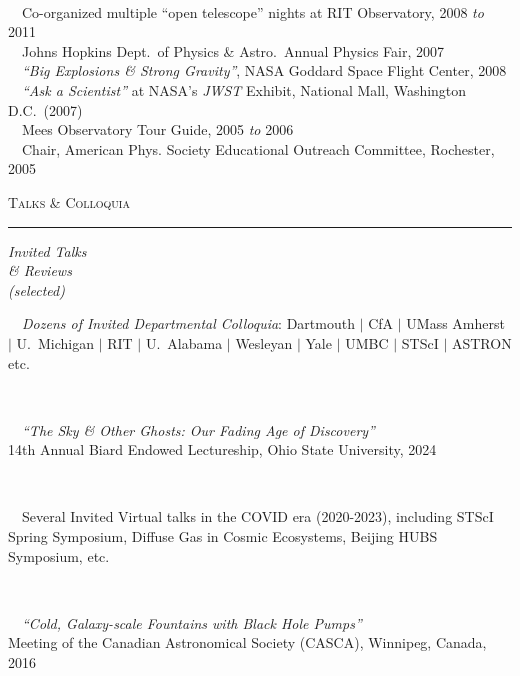 \documentclass[11pt]{article}
\makeatletter
\def\vhrulefill#1{\leavevmode\leaders\hrule\@height#1\hfill \kern\z@}
\makeatother
\begin{document}
{\\ \textbullet~~Co-organized multiple ``open telescope'' nights at RIT Observatory, 2008 \textit{to} 2011
\\ \textbullet~~Johns Hopkins Dept.~of Physics \& Astro.~Annual Physics Fair, 2007
\\ \textbullet~~\textit{``Big Explosions \& Strong Gravity''}, NASA Goddard Space Flight Center, 2008
\\ \textbullet~~\textit{``Ask a Scientist''} at NASA's \textit{JWST} Exhibit, National Mall, Washington D.C.~(2007)
\\ \textbullet~~Mees Observatory Tour Guide, 2005 \textit{to} 2006
\\ \textbullet~~Chair, American Phys. Society Educational Outreach Committee, Rochester, 2005
}



\vspace{4mm}



\textsc{Talks \& Colloquia} \vhrulefill{0.4pt}

\vspace{4mm}

\hspace{2.5mm} \parbox{1.5in}{\textit{Invited Talks \\ \& Reviews \\ (selected)}}
\parbox{5.15in}{
\textbullet~~\textit{Dozens of Invited Departmental Colloquia}: Dartmouth $|$ CfA $|$ UMass Amherst $|$ U.~Michigan $|$ RIT $|$ U.~Alabama $|$ Wesleyan $|$ Yale $|$ UMBC $|$ STScI $|$ ASTRON etc.} \\

\hspace{42mm} \parbox{5.15in}{
\textbullet~~\textit{``The Sky \& Other Ghosts: Our Fading Age of Discovery''}\\ 14th Annual Biard Endowed Lectureship, Ohio State University, 2024}\\

\hspace{42mm} \parbox{5.15in}{
  \textbullet~~Several Invited Virtual talks in the COVID era (2020-2023), including STScI Spring Symposium, Diffuse Gas in Cosmic Ecosystems, Beijing HUBS Symposium, etc.}\\

\hspace{42mm} \parbox{5.15in}{
\textbullet~~\textit{``Cold, Galaxy-scale Fountains with Black Hole Pumps''}\\ Meeting of the Canadian Astronomical Society (CASCA), Winnipeg, Canada, 2016}\\
\end{document}
